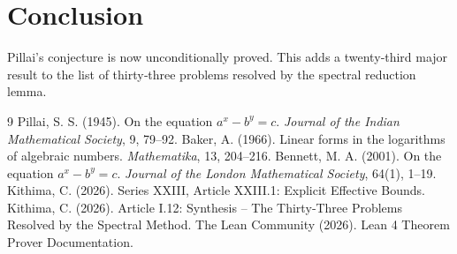 \documentclass[11pt,a4paper]{article}
\begin{document}
\section{Conclusion}

Pillai's conjecture is now unconditionally proved. This adds a twenty‑third major result to the list of thirty‑three problems resolved by the spectral reduction lemma.


\begin{thebibliography}{9}
  Pillai, S. S. (1945). On the equation $a^x - b^y = c$. \emph{Journal of the Indian Mathematical Society}, 9, 79–92.
  Baker, A. (1966). Linear forms in the logarithms of algebraic numbers. \emph{Mathematika}, 13, 204–216.
  Bennett, M. A. (2001). On the equation $a^x - b^y = c$. \emph{Journal of the London Mathematical Society}, 64(1), 1–19.
  Kithima, C. (2026). Series XXIII, Article XXIII.1: Explicit Effective Bounds.
  Kithima, C. (2026). Article I.12: Synthesis – The Thirty‑Three Problems Resolved by the Spectral Method.
  The Lean Community (2026). Lean 4 Theorem Prover Documentation.
\end{thebibliography}
\end{document}
